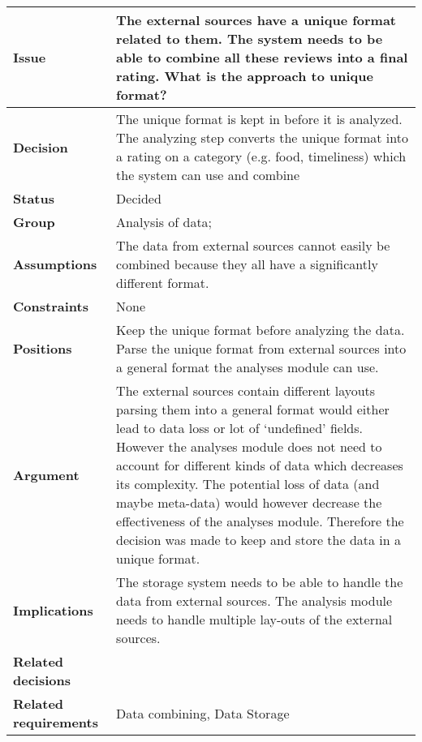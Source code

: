 
{\large{}}
\begin{tabular}{ l  p{10cm}}
\hline
\bf Issue & The external sources have a unique format related to them. The system needs to be able to combine all these reviews into a final rating. What is the approach to unique format?\\
\hline
\bf Decision & The unique format is kept in before it is analyzed. The analyzing step converts the unique format into a rating on a category (e.g. food, timeliness) which the system can use and combine \\
\hline
\bf Status & Decided\\
\hline
\bf Group & Analysis of data; \\
\hline
\bf Assumptions & The data from external sources cannot easily be combined because they all have a significantly different format.  \\
\hline
\bf Constraints & None \\
\hline
\bf Positions & Keep the unique format before analyzing the data. \newline\newline
Parse the unique format from external sources into a general format the analyses module can use. 
 \\
\hline
\bf Argument & The external sources contain different layouts parsing them into a general format would either lead to data loss or lot of ‘undefined’ fields. However the analyses module does not need to account for different kinds of data which decreases its complexity. The potential loss of data (and maybe meta-data)  would however decrease the effectiveness of the analyses module. Therefore the decision was made to keep and store the data in a unique format.  \\
\hline
\bf Implications & The storage system needs to be able to handle the data from external sources. The analysis module needs to handle multiple lay-outs of the external sources.  \\
\hline
\bf Related decisions & \\
\hline
\bf Related requirements  & Data combining, Data Storage \\
\hline
\end{tabular}
